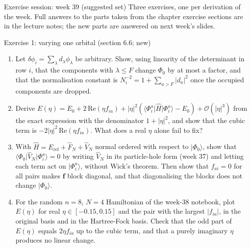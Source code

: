\documentclass[aspectratio=169,10pt]{beamer}
\newcommand{\ket}[1]{\vert #1\rangle}
\newcommand{\element}[3]{\langle #1\vert #2\vert #3\rangle}
\newcommand{\bigO}{\mathcal{O}}
\begin{document}
\begin{frame}{Exercise session: week 39 (suggested set)}
  \footnotesize
  Three exercises, one per derivation of the week. Full answers to the parts taken from the chapter exercise sections are in the lecture notes; the new parts are answered on next week's slides.
  \begin{block}{Exercise 1: varying one orbital (section 6.6; new)}
    \begin{enumerate}
      \item[a)] Let $\delta\phi_i=\sum_\lambda d_\lambda\phi_\lambda$ be arbitrary. Show, using linearity of the determinant in row $i$, that the components with $\lambda\le F$ change $\Phi_0$ by at most a factor, and that the normalisation constant is $N_i^{-2}=1+\sum_{a>F}|d_a|^2$ once the occupied components are dropped.
      \item[b)] Derive $E(\eta)=E_0+2\,\mathrm{Re}(\eta f_{ia})+|\eta|^2(\element{\Phi_i^a}{\hat{H}}{\Phi_i^a}-E_0)+\bigO(|\eta|^3)$ from the exact expression with the denominator $1+|\eta|^2$, and show that the cubic term is $-2|\eta|^2\,\mathrm{Re}(\eta f_{ia})$. What does a real $\eta$ alone fail to fix?
      \item[c)] With $\hat{H}=E_{\mathrm{ref}}+\hat{F}_N+\hat{V}_N$ normal ordered with respect to $\ket{\Phi_0}$, show that $\element{\Phi_0}{\hat{V}_N}{\Phi_i^a}=0$ by writing $\hat{V}_N$ in its particle-hole form (week 37) and letting each term act on $\ket{\Phi_i^a}$, without Wick's theorem. Then show that $f_{ai}=0$ for all pairs makes $\bm{f}$ block diagonal, and that diagonalising the blocks does not change $\ket{\Phi_0}$.
      \item[d)] For the random $n=8$, $N=4$ Hamiltonian of the week-38 notebook, plot $E(\eta)$ for real $\eta\in[-0.15,0.15]$ and the pair with the largest $|f_{ia}|$, in the original basis and in the Hartree-Fock basis. Check that the odd part of $E(\eta)$ equals $2\eta f_{ia}$ up to the cubic term, and that a purely imaginary $\eta$ produces no linear change.
    \end{enumerate}
  \end{block}
\end{frame}
\end{document}

